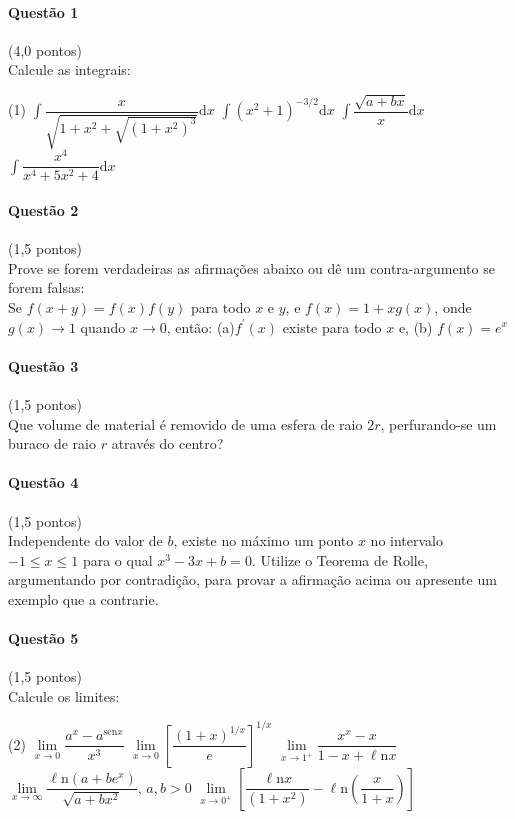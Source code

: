 \documentclass[12pt,a4paper]{article}
\newcommand{\sen}{\mathrm{sen}}
\newcommand{\dd}{\mathrm{d}}
\newcommand{\Ln}{\ell\mathrm{n}}
\newcommand{\intin}{\displaystyle\int}
\begin{document}
\begin{multicols}{2}\setlength{\columnsep}{1.5cm}\setlength{\columnseprule}{0.2pt}

\paragraph{Questão 1} (4,0 pontos)\\
Calcule as integrais:
\begin{tasks}(1)
\task $\displaystyle \int \dfrac{x}{\sqrt{1+x^2+\sqrt{(1+x^2)^3}}}\dd x$
\task $\intin (x^2+1)^{-3/2}\dd x$
\task $\intin \dfrac{\sqrt{a+bx}}{x}\dd x$
\task $\intin \dfrac{x^4}{x^4+5x^2 + 4}\dd x$
\end{tasks}

\paragraph{Questão 2} (1,5 pontos)\\
Prove se forem verdadeiras as afirmações abaixo ou dê um contra-argumento se forem falsas:\\
\noindent Se $f(x+y) = f(x)f(y)$ para todo $x$ e $y$, e $f(x) = 1+xg(x)$, onde $g(x) \to 1$ quando $x \to 0$, então: (a)$f^{\prime}(x)$ existe para todo $x$ e, (b) $f(x)=e^x$

\paragraph{Questão 3} (1,5 pontos)\\
Que volume de material é removido de uma esfera de raio $2r$, perfurando-se um buraco de raio $r$ através do centro?

\paragraph{Questão 4} (1,5 pontos)\\
Independente do valor de $b$, existe no máximo um ponto $x$ no intervalo $-1\le x \le 1$ para o qual $x^3 -3x + b =0$. Utilize o Teorema de Rolle, argumentando por contradição, para provar a afirmação acima ou apresente um exemplo que a contrarie.

\paragraph{Questão 5} (1,5 pontos)\\
Calcule os limites:
\begin{tasks}(2)
\task $\lim\limits_{x\to 0} \dfrac{a^x-a^{\sen x}}{x^3}$
\task $\lim\limits_{x\to 0} \left[ \dfrac{(1+x)^{1/x}}{e}\right]^{1/x}$
\task $\lim\limits_{x\to 1^{+}}\dfrac{x^x - x}{1-x+\Ln x}$
\task $\lim\limits_{x\to \infty} \dfrac{\Ln(a+be^x)}{\sqrt{a+bx^2}},\, a,b>0$
\task $\lim\limits_{x\to 0^{+}}\left[\dfrac{\Ln x}{(1+x^2)} - \Ln \left(\dfrac{x}{1+x} \right) \right]$
\end{tasks}

\end{multicols}
\normalsize
\end{document}

